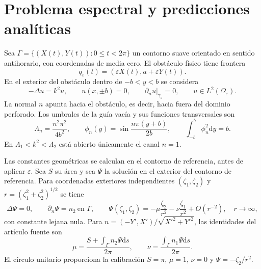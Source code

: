 \documentclass[11pt]{article}
\newcommand{\eps}{\varepsilon}
\newcommand{\dd}{\mathrm{d}}
\begin{document}
\section{Problema espectral y predicciones analíticas}
Sea $\Gamma=\{(X(t),Y(t)):0\leq t<2\pi\}$ un contorno suave orientado en sentido antihorario, con coordenadas de media cero. El obstáculo físico tiene frontera
\begin{equation}
 q_\eps(t)=(\eps X(t),a+\eps Y(t)).\label{eq:geometry}
\end{equation}
En el exterior del obstáculo dentro de $-b<y<b$ se considera
\begin{equation}
 -\Delta u=k^2u,\qquad u(x,\pm b)=0,\qquad
 \partial_nu|_{\gamma_\eps}=0,\qquad u\in L^2(\Omega_\eps).
 \label{eq:problem}
\end{equation}
La normal $n$ apunta hacia el obstáculo, es decir, hacia fuera del dominio perforado. Los umbrales de la guía vacía y sus funciones transversales son
\begin{equation}
 \Lambda_n=\frac{n^2\pi^2}{4b^2},\qquad
 \phi_n(y)=\sin\frac{n\pi(y+b)}{2b},\qquad
 \int_{-b}^b\phi_n^2\dd y=b.\label{eq:threshold}
\end{equation}
En $\Lambda_1<k^2<\Lambda_2$ está abierto únicamente el canal $n=1$.

Las constantes geométricas se calculan en el contorno de referencia, antes de aplicar $\eps$. Sea $S$ su área y sea $\Psi$ la solución en el exterior del contorno de referencia. Para coordenadas exteriores independientes $(\zeta_1,\zeta_2)$ y $r=(\zeta_1^2+\zeta_2^2)^{1/2}$ se tiene
\begin{equation}
 \Delta\Psi=0,\qquad \partial_n\Psi=n_2\ \text{en }\Gamma,
 \qquad \Psi(\zeta_1,\zeta_2)=-\mu\frac{\zeta_2}{r^2}-\nu\frac{\zeta_1}{r^2}+O(r^{-2}),\quad r\to\infty,
 \label{eq:laplace}
\end{equation}
con constante lejana nula. Para $n=(-Y',X')/\sqrt{X'^2+Y'^2}$, las identidades del artículo fuente son
\begin{equation}
 \mu=\frac{S+\int_\Gamma n_2\Psi\dd s}{2\pi},\qquad
 \nu=\frac{\int_\Gamma n_1\Psi\dd s}{2\pi}.\label{eq:dipoles}
\end{equation}
El círculo unitario proporciona la calibración $S=\pi$, $\mu=1$, $\nu=0$ y $\Psi=-\zeta_2/r^2$.
\end{document}
